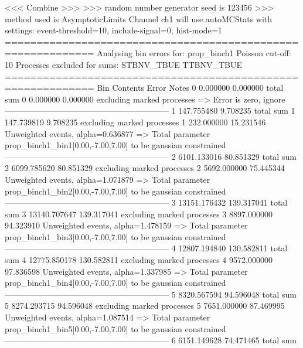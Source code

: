  <<< Combine >>> 
>>> random number generator seed is 123456
>>> method used is AsymptoticLimits
Channel ch1 will use autoMCStats with settings: event-threshold=10, include-signal=0, hist-mode=1
============================================================
Analysing bin errors for: prop_binch1
Poisson cut-off: 10
Processes excluded for sums: STBNV_TBUE TTBNV_TBUE
============================================================
Bin        Contents        Error           Notes                         
0          0.000000        0.000000        total sum                     
0          0.000000        0.000000        excluding marked processes    
  => Error is zero, ignore      
------------------------------------------------------------
1          147.755480      9.708235        total sum                     
1          147.739819      9.708235        excluding marked processes    
1          232.000000      15.231546       Unweighted events, alpha=0.636877
  => Total parameter prop_binch1_bin1[0.00,-7.00,7.00] to be gaussian constrained
------------------------------------------------------------
2          6101.133016     80.851329       total sum                     
2          6099.785620     80.851329       excluding marked processes    
2          5692.000000     75.445344       Unweighted events, alpha=1.071879
  => Total parameter prop_binch1_bin2[0.00,-7.00,7.00] to be gaussian constrained
------------------------------------------------------------
3          13151.176432    139.317041      total sum                     
3          13140.707647    139.317041      excluding marked processes    
3          8897.000000     94.323910       Unweighted events, alpha=1.478159
  => Total parameter prop_binch1_bin3[0.00,-7.00,7.00] to be gaussian constrained
------------------------------------------------------------
4          12807.194840    130.582811      total sum                     
4          12775.850178    130.582811      excluding marked processes    
4          9572.000000     97.836598       Unweighted events, alpha=1.337985
  => Total parameter prop_binch1_bin4[0.00,-7.00,7.00] to be gaussian constrained
------------------------------------------------------------
5          8320.567594     94.596048       total sum                     
5          8274.293715     94.596048       excluding marked processes    
5          7651.000000     87.469995       Unweighted events, alpha=1.087514
  => Total parameter prop_binch1_bin5[0.00,-7.00,7.00] to be gaussian constrained
------------------------------------------------------------
6          6151.149628     74.471465       total sum                     
